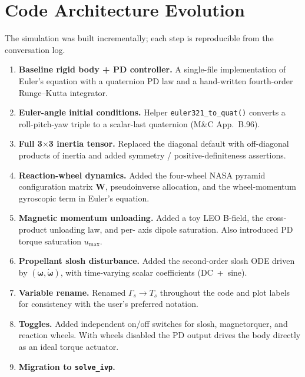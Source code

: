 \section{Code Architecture Evolution}

The simulation was built incrementally; each step is reproducible from
the conversation log.

\begin{enumerate}\setlength{\itemsep}{4pt}
  \item \textbf{Baseline rigid body + PD controller.}
        A single-file implementation of Euler's equation with a quaternion
        PD law and a hand-written fourth-order Runge--Kutta integrator.
  \item \textbf{Euler-angle initial conditions.}
        Helper \texttt{euler321\_to\_quat()} converts a roll-pitch-yaw
        triple to a scalar-last quaternion (M\&C App.~B.96).
  \item \textbf{Full 3$\times$3 inertia tensor.}
        Replaced the diagonal default with off-diagonal products of inertia
        and added symmetry / positive-definiteness assertions.
  \item \textbf{Reaction-wheel dynamics.}
        Added the four-wheel NASA pyramid configuration matrix \(\bm{W}\),
        pseudoinverse allocation, and the wheel-momentum gyroscopic term in
        Euler's equation.
  \item \textbf{Magnetic momentum unloading.}
        Added a toy LEO B-field, the cross-product unloading law, and per-
        axis dipole saturation. Also introduced PD torque saturation
        \(u_{\max}\).
  \item \textbf{Propellant slosh disturbance.}
        Added the second-order slosh ODE driven by \((\bm{\omega},
        \dot{\bm{\omega}})\), with time-varying scalar coefficients
        (DC~+~sine).
  \item \textbf{Variable rename.}
        Renamed \(\Gamma_s \to T_s\) throughout the code and plot labels
        for consistency with the user's preferred notation.
  \item \textbf{Toggles.}
        Added independent on/off switches for slosh, magnetorquer, and
        reaction wheels. With wheels disabled the PD output drives the body
        directly as an ideal torque actuator.
  \item \textbf{Migration to \texttt{solve\_ivp}.}

\end{enumerate}
